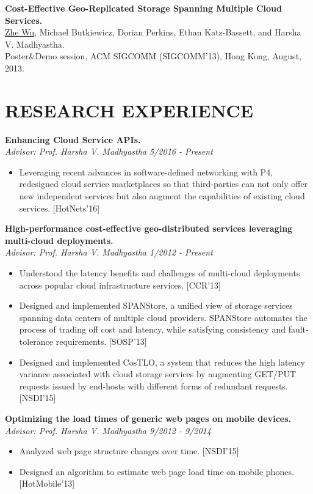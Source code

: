 \documentclass[zhemargin]{res}
\begin{document}
\begin{resume}
    \textbf{Cost-Effective Geo-Replicated Storage Spanning Multiple Cloud Services.} \\
    \underline{Zhe Wu}, Michael Butkiewicz, Dorian Perkins, Ethan Katz-Bassett, and Harsha V. Madhyastha.\\
    Poster\&Demo session, ACM SIGCOMM (SIGCOMM'13), Hong Kong, August, 2013.


\section{\small RESEARCH EXPERIENCE}
	\textbf{Enhancing Cloud Service APIs.}\\
    \textit{Advisor: Prof. Harsha V. Madhyastha \hfill 5/2016 - Present}
	\begin{itemize}
    \item Leveraging recent advances in software-defined networking with P4, redesigned cloud service marketplaces so that third-parties can not only offer new independent services but also augment the capabilities of existing cloud services. [HotNets'16]
	\end{itemize}

	\textbf{High-performance cost-effective geo-distributed services leveraging multi-cloud deployments.}\\
    \textit{Advisor: Prof. Harsha V. Madhyastha \hfill 1/2012 - Present}
	\begin{itemize}
	\item Understood the latency benefits and challenges of multi-cloud deployments across popular cloud infrastructure services. [CCR'13]
	\item Designed and implemented SPANStore, a unified view of storage services spanning data centers of multiple cloud providers. SPANStore automates the process of trading off cost and latency, while satisfying consistency and fault-tolerance requirements. [SOSP'13]
    \item Designed and implemented CosTLO, a system that reduces the high latency variance associated with cloud storage services by augmenting GET/PUT requests issued by end-hosts with different forms of redundant requests. [NSDI'15]
	\end{itemize}

	\textbf{Optimizing the load times of generic web pages on mobile devices.}\\
    \textit{Advisor: Prof. Harsha V. Madhyastha \hfill 9/2012 - 9/2014}
	\begin{itemize}
	\item Analyzed web page structure changes over time. [NSDI'15]
	\item Designed an algorithm to estimate web page load time on mobile phones. [HotMobile'13]
	\end{itemize}


\end{resume}
\end{document}
